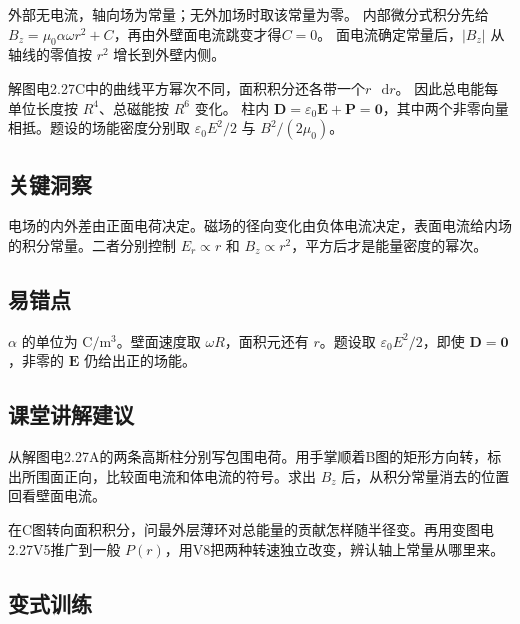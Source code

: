 \documentclass[UTF8,fontset=fandol,a4paper,11pt]{ctexart}
\newcommand{\dd}{\mathop{}\!\mathrm{d}}
\newcommand{\vect}[1]{\bm{#1}}
\begin{document}
外部无电流，轴向场为常量；无外加场时取该常量为零。
内部微分式积分先给$B_z=\mu_0\alpha\omega r^2+C$，再由外壁面电流跳变才得$C=0$。
面电流确定常量后，$|B_z|$ 从轴线的零值按 $r^2$ 增长到外壁内侧。

解图电2.27C中的曲线平方幂次不同，面积积分还各带一个$r\,\dd r$。
因此总电能每单位长度按 $R^4$、总磁能按 $R^6$ 变化。
柱内 $\vect D=\varepsilon_0\vect E+\vect P=\vect0$，其中两个非零向量相抵。题设的场能密度分别取 $\varepsilon_0 E^2/2$ 与 $B^2/(2\mu_0)$。




\subsection*{关键洞察}

电场的内外差由正面电荷决定。磁场的径向变化由负体电流决定，表面电流给内场的积分常量。二者分别控制 $E_r\propto r$ 和 $B_z\propto r^2$，平方后才是能量密度的幂次。



\subsection*{易错点}

$\alpha$ 的单位为 $\mathrm{C/m^3}$。壁面速度取 $\omega R$，面积元还有 $r$。题设取 $\varepsilon_0E^2/2$，即使 $\vect D=\vect0$，非零的 $\vect E$ 仍给出正的场能。



\subsection*{课堂讲解建议}

从解图电2.27A的两条高斯柱分别写包围电荷。用手掌顺着B图的矩形方向转，标出所围面正向，比较面电流和体电流的符号。求出 $B_z$ 后，从积分常量消去的位置回看壁面电流。

在C图转向面积积分，问最外层薄环对总能量的贡献怎样随半径变。再用变图电2.27V5推广到一般 $P(r)$，用V8把两种转速独立改变，辨认轴上常量从哪里来。


\subsection*{变式训练}
\end{document}
